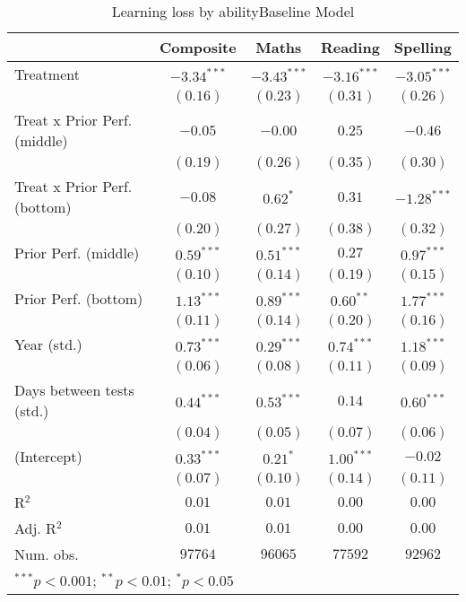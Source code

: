 
\begin{table}
\begin{center}
\begin{tabular}{l c c c c}
\hline
 & Composite & Maths & Reading & Spelling \\
\hline
Treatment                    & $-3.34^{***}$ & $-3.43^{***}$ & $-3.16^{***}$ & $-3.05^{***}$ \\
                             & $(0.16)$      & $(0.23)$      & $(0.31)$      & $(0.26)$      \\
Treat x Prior Perf. (middle) & $-0.05$       & $-0.00$       & $0.25$        & $-0.46$       \\
                             & $(0.19)$      & $(0.26)$      & $(0.35)$      & $(0.30)$      \\
Treat x Prior Perf. (bottom) & $-0.08$       & $0.62^{*}$    & $0.31$        & $-1.28^{***}$ \\
                             & $(0.20)$      & $(0.27)$      & $(0.38)$      & $(0.32)$      \\
Prior Perf. (middle)         & $0.59^{***}$  & $0.51^{***}$  & $0.27$        & $0.97^{***}$  \\
                             & $(0.10)$      & $(0.14)$      & $(0.19)$      & $(0.15)$      \\
Prior Perf. (bottom)         & $1.13^{***}$  & $0.89^{***}$  & $0.60^{**}$   & $1.77^{***}$  \\
                             & $(0.11)$      & $(0.14)$      & $(0.20)$      & $(0.16)$      \\
Year (std.)                  & $0.73^{***}$  & $0.29^{***}$  & $0.74^{***}$  & $1.18^{***}$  \\
                             & $(0.06)$      & $(0.08)$      & $(0.11)$      & $(0.09)$      \\
Days between tests (std.)    & $0.44^{***}$  & $0.53^{***}$  & $0.14$        & $0.60^{***}$  \\
                             & $(0.04)$      & $(0.05)$      & $(0.07)$      & $(0.06)$      \\
(Intercept)                  & $0.33^{***}$  & $0.21^{*}$    & $1.00^{***}$  & $-0.02$       \\
                             & $(0.07)$      & $(0.10)$      & $(0.14)$      & $(0.11)$      \\
\hline
R$^2$                        & $0.01$        & $0.01$        & $0.00$        & $0.00$        \\
Adj. R$^2$                   & $0.01$        & $0.01$        & $0.00$        & $0.00$        \\
Num. obs.                    & $97764$       & $96065$       & $77592$       & $92962$       \\
\hline
\multicolumn{5}{l}{\scriptsize{$^{***}p<0.001$; $^{**}p<0.01$; $^{*}p<0.05$}}
\end{tabular}
\caption{Learning loss by abilityBaseline Model}
\label{tableability}
\end{center}
\end{table}
